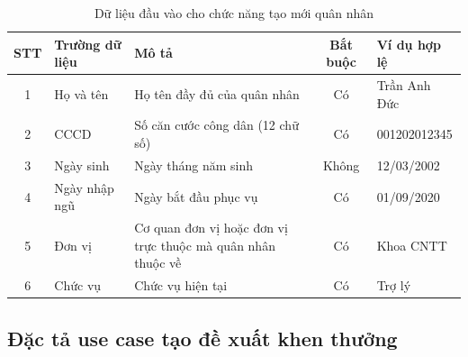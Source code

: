 \documentclass[../DoAn.tex]{subfiles}
\begin{document}
\begin{table}[H]
\centering
\caption{Dữ liệu đầu vào cho chức năng tạo mới quân nhân}
\label{tab:uc02-input}
\begin{tabular}{|c|p{3.2cm}|p{4.3cm}|c|p{2.5cm}|}
\hline
\textbf{STT} & \textbf{Trường dữ liệu} & \textbf{Mô tả} & \textbf{Bắt buộc} & \textbf{Ví dụ hợp lệ} \\ \hline
1 & Họ và tên & Họ tên đầy đủ của quân nhân & Có & Trần Anh Đức \\ \hline
2 & CCCD & Số căn cước công dân (12 chữ số) & Có & 001202012345 \\ \hline
3 & Ngày sinh & Ngày tháng năm sinh & Không & 12/03/2002 \\ \hline
4 & Ngày nhập ngũ & Ngày bắt đầu phục vụ & Có & 01/09/2020 \\ \hline
5 & Đơn vị & Cơ quan đơn vị hoặc đơn vị trực thuộc mà quân nhân thuộc về & Có & Khoa CNTT \\ \hline
6 & Chức vụ & Chức vụ hiện tại & Có & Trợ lý \\ \hline
\end{tabular}
\end{table}

\subsection{Đặc tả use case tạo đề xuất khen thưởng}
\end{document}
